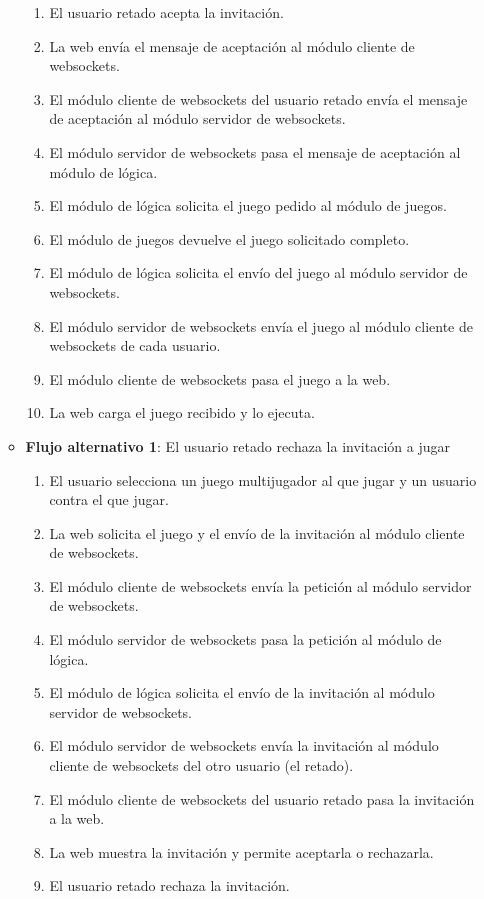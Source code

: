 \begin{enumerate}
\begin{itemize}
\begin{enumerate}
    \item El usuario retado acepta la invitación.
    \item La web envía el mensaje de aceptación al módulo cliente de websockets.
    \item El módulo cliente de websockets  del usuario retado envía el mensaje de aceptación al módulo servidor de websockets.
    \item El módulo servidor de websockets pasa el mensaje de aceptación al módulo de lógica.
    \item El módulo de lógica solicita el juego pedido al módulo de juegos.
    \item El módulo de juegos devuelve el juego solicitado completo.
    \item El módulo de lógica solicita el envío del juego al módulo servidor de websockets.
    \item El módulo servidor de websockets envía el juego al módulo cliente de websockets de cada usuario.
    \item El módulo cliente de websockets pasa el juego a la web.
    \item La web carga el juego recibido y lo ejecuta.    
    \end{enumerate}
  \item \textbf{Flujo alternativo 1}: El usuario retado rechaza la invitación a jugar
    \begin{enumerate}
    \item El usuario selecciona un juego multijugador al que jugar y un usuario contra el que jugar.
    \item La web solicita el juego y el envío de la invitación al módulo cliente de websockets.
    \item El módulo cliente de websockets envía la petición al módulo servidor de websockets.
    \item El módulo servidor de websockets pasa la petición al módulo de lógica.
    \item El módulo de lógica solicita el envío de la invitación al módulo servidor de websockets.
    \item El módulo servidor de websockets envía la invitación al módulo cliente de websockets del otro usuario (el retado).
    \item El módulo cliente de websockets del usuario retado pasa la invitación a la web.
    \item La web muestra la invitación y permite aceptarla o rechazarla.
    \item El usuario retado rechaza la invitación.

\end{enumerate}
\end{itemize}
\end{enumerate}
